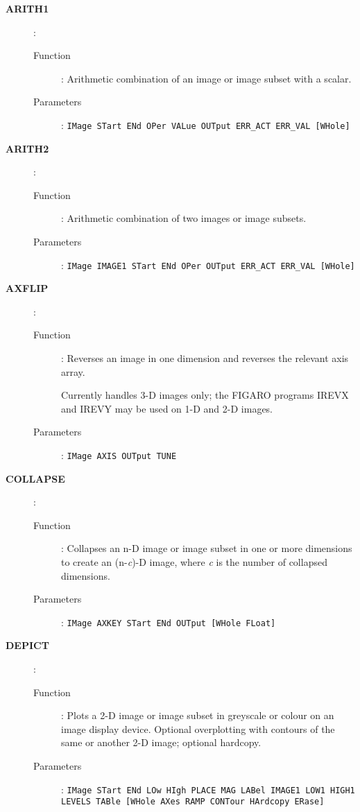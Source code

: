 \begin{description}

\item[\large\bf ARITH1]:
   \begin{description}
   \item[Function]: 
      Arithmetic combination of an image or image subset with a scalar.
   \item[Parameters]:
      {\tt IMage STart ENd OPer VALue OUTput ERR\_ACT ERR\_VAL [WHole]}
   \end{description}

\item[\large\bf ARITH2]:
   \begin{description}
   \item[Function]: 
      Arithmetic combination of two images or image subsets.
   \item[Parameters]: 
      {\tt IMage IMAGE1 STart ENd OPer OUTput ERR\_ACT ERR\_VAL [WHole]}
   \end{description}

\item[\large\bf AXFLIP]:
   \begin{description}
   \item[Function]: 
      Reverses an image in one dimension and reverses the relevant axis array. 

      Currently handles 3-D images only; the FIGARO programs IREVX and IREVY
      may be used on 1-D and 2-D images.
   \item[Parameters]: 
      {\tt IMage AXIS OUTput TUNE}
   \end{description}

\item[\large\bf COLLAPSE]:
   \begin{description}
   \item[Function]: 
      Collapses an n-D image or image subset in one or more dimensions to
      create an (n-{\it c})-D image, where {\it c} is the number of collapsed
      dimensions.
   \item[Parameters]: 
      {\tt IMage AXKEY STart ENd OUTput [WHole FLoat]}
   \end{description}

\item[\large\bf DEPICT]:
   \begin{description}
   \item[Function]: 
      Plots a 2-D image or image subset in greyscale or colour on an image 
      display device. Optional overplotting with contours of the same or
      another 2-D image; optional hardcopy.
   \item[Parameters]:
      {\tt IMage STart ENd LOw HIgh PLACE MAG LABel IMAGE1 LOW1 HIGH1\\
      LEVELS TABle [WHole AXes RAMP CONTour HArdcopy ERase]}
   \end{description}


\end{description}
